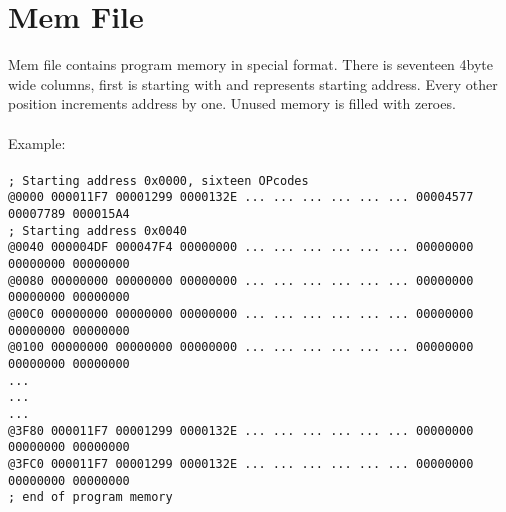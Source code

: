         \section{Mem File}
            Mem file contains program memory in special format. There is seventeen 4byte wide columns, first is starting with \@ and represents starting address.
            Every other position increments address by one. Unused memory is filled with zeroes.\\\\
            Example:
            {
                ~\\
                \usecodefont\\
                \verb'; Starting address 0x0000, sixteen OPcodes'\\
                \verb'@0000 000011F7 00001299 0000132E ... ... ... ... ... ... 00004577 00007789 000015A4'\\
                \verb'; Starting address 0x0040'\\
                \verb'@0040 000004DF 000047F4 00000000 ... ... ... ... ... ... 00000000 00000000 00000000'\\
                \verb'@0080 00000000 00000000 00000000 ... ... ... ... ... ... 00000000 00000000 00000000'\\
                \verb'@00C0 00000000 00000000 00000000 ... ... ... ... ... ... 00000000 00000000 00000000'\\
                \verb'@0100 00000000 00000000 00000000 ... ... ... ... ... ... 00000000 00000000 00000000'\\
                \verb'...'\\
                \verb'...'\\
                \verb'...'\\
                \verb'@3F80 000011F7 00001299 0000132E ... ... ... ... ... ... 00000000 00000000 00000000'\\
                \verb'@3FC0 000011F7 00001299 0000132E ... ... ... ... ... ... 00000000 00000000 00000000'\\
                \verb'; end of program memory'\\
            }
